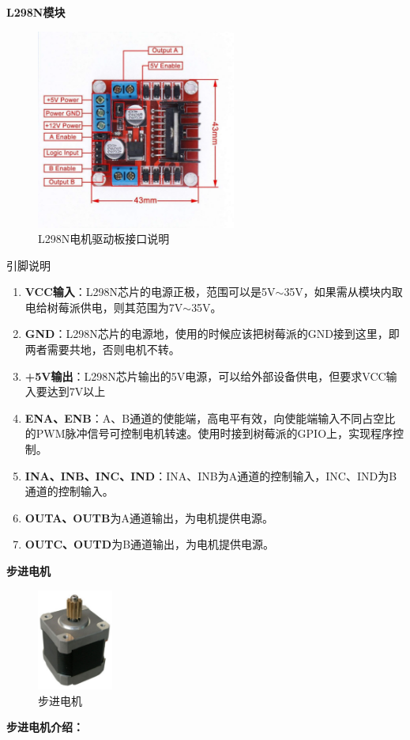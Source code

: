 \documentclass[UTF8,14pt]{article}
\newcommand\sectiontwo[1]{\centerline{\large{\bfseries{#1}}}}
\begin{document}
\vspace{0.5cm}
\sectiontwo{L298N模块}
\begin{figure}%
	\vspace{-0.4cm}
	\centering
	\includegraphics[width=6.56cm]{figures/motor-driver.pdf}
	\vspace{-10pt}
	\caption{L298N电机驱动板接口说明}
	\vspace{-15pt}
\end{figure}
引脚说明
\begin{enumerate}
	\item \textbf{VCC输入}：L298N芯片的电源正极，范围可以是5V$\sim$35V，如果需从模块内取电给树莓派供电，则其范围为7V$\sim$35V。
	\item \textbf{GND}：L298N芯片的电源地，使用的时候应该把树莓派的GND接到这里，即两者需要共地，否则电机不转。
	\item \textbf{+5V输出}：L298N芯片输出的5V电源，可以给外部设备供电，但要求VCC输入要达到7V以上
	\item \textbf{ENA、ENB}：A、B通道的使能端，高电平有效，向使能端输入不同占空比的PWM脉冲信号可控制电机转速。使用时接到树莓派的GPIO上，实现程序控制。
	\item \textbf{INA、INB、INC、IND}：INA、INB为A通道的控制输入，INC、IND为B通道的控制输入。
	\item \textbf{OUTA、OUTB}为A通道输出，为电机提供电源。
	\item \textbf{OUTC、OUTD}为B通道输出，为电机提供电源。
\end{enumerate}

\vspace{0.3cm}
\sectiontwo{步进电机}
\begin{figure}
	\centering
	\includegraphics[width=2.5cm]{figures/bujindianji.pdf}
	\vspace{-10pt}
	\caption{步进电机}
	\vspace{-15pt}
\end{figure}
{\bfseries{步进电机介绍：}}
\end{document}
